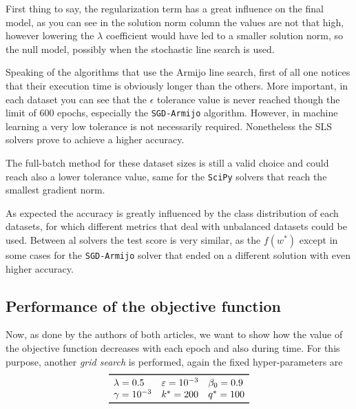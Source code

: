 
First thing to say, the regularization term has a great influence on the final model, as you can see in the solution norm column the values are not that high, however lowering the $\lambda$ coefficient would have led to a smaller solution norm, so the null model, possibly when the stochastic line search is used.

Speaking of the algorithms that use the Armijo line search, first of all one notices that their execution time is obviously longer than the others. More important, in each dataset you can see that the $\epsilon$ tolerance value is never reached though the limit of 600 epochs, especially the \texttt{SGD-Armijo} algorithm. However, in machine learning a very low tolerance is not necessarily required. Nonetheless the SLS solvers prove to achieve a higher accuracy.

The full-batch method for these dataset sizes is still a valid choice and could reach also a lower tolerance value, same for the \texttt{SciPy} solvers that reach the smallest gradient norm.

As expected the accuracy is greatly influenced by the class distribution of each datasets, for which different metrics that deal with unbalanced datasets could be used. Between al solvers the test score is very similar, as the $f(w^\ast)$ except in some cases for the \texttt{SGD-Armijo} solver that ended on a different solution with even higher accuracy.

\subsection{Performance of the objective function}

Now, as done by the authors of both articles, we want to show how the value of the objective function decreases with each epoch and also during time. For this purpose, another \emph{grid search} is performed, again the fixed hyper-parameters are
\[
\begin{array}{lll}
\toprule
\lambda=0.5 & \epsilon=\num{e-3} & \beta_0=0.9 \\
\gamma=\num{e-3} & k^\ast=200 & q^\ast=100 \\
\bottomrule
\end{array}
\]

